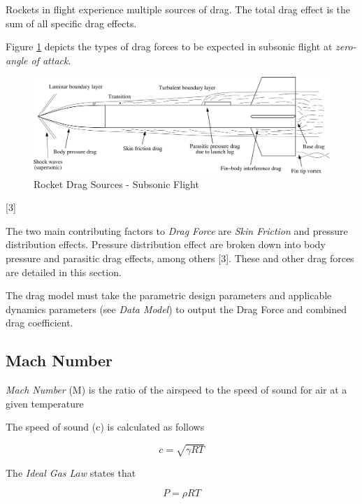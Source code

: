 \documentclass[]{article}
\begin{document}
Rockets in flight experience multiple sources of drag. The total drag
effect is the sum of all specific drag effects.

Figure \ref{rocket_drag_sources_label} depicts the types of drag forces
to be expected in subsonic flight at \emph{zero-angle of attack}.

\begin{figure}[htbp]
\centering
\includegraphics{images/drag_sources_niskanen2013.png}
\caption{Rocket Drag Sources - Subsonic Flight
\label{rocket_drag_sources_label}}
\end{figure}

{[}3{]}

The two main contributing factors to \emph{Drag Force} are \emph{Skin
Friction} and pressure distribution effects. Pressure distribution
effect are broken down into body pressure and parasitic drag effects,
among others {[}3{]}. These and other drag forces are detailed in this
section.

The drag model must take the parametric design parameters and applicable
dynamics parameters (see \emph{Data Model}) to output the Drag Force and
combined drag coefficient.

\subsection{Mach Number}\label{mach-number}

\emph{Mach Number} (M) is the ratio of the airspeed to the speed of
sound for air at a given temperature

The speed of sound (c) is calculated as follows

\begin{equation}
c = \sqrt{\gamma R T } 
\end{equation}

The \emph{Ideal Gas Law} states that

\begin{equation}
\label{ideal_gas_law}
P = \rho R T
\end{equation}
\end{document}
